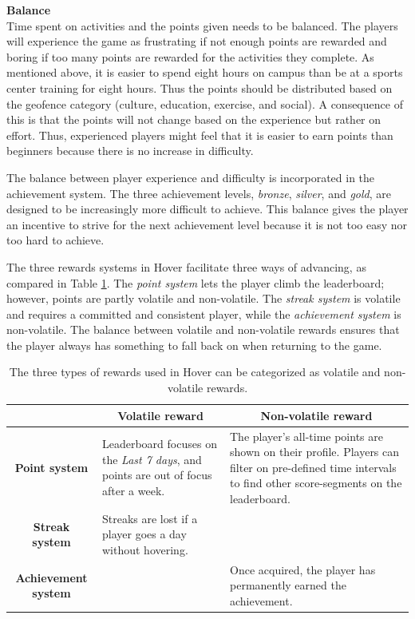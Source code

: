 \textbf{Balance} \\
Time spent on activities and the points given needs to be balanced. The players will experience the game as frustrating if not enough points are rewarded and boring if too many points are rewarded for the activities they complete. As mentioned above, it is easier to spend eight hours on campus than be at a sports center training for eight hours. Thus the points should be distributed based on the geofence category (culture, education, exercise, and social). A consequence of this is that the points will not change based on the experience but rather on effort. Thus, experienced players might feel that it is easier to earn points than beginners because there is no increase in difficulty.

The balance between player experience and difficulty is incorporated in the achievement system. The three achievement levels, \textit{bronze}, \textit{silver}, and \textit{gold}, are designed to be increasingly more difficult to achieve. This balance gives the player an incentive to strive for the next achievement level because it is not too easy nor too hard to achieve. 

The three rewards systems in Hover facilitate three ways of advancing, as compared in Table \ref{tab:rewardsystems_balance}. The \textit{point system} lets the player climb the leaderboard; however, points are partly volatile and non-volatile. The \textit{streak system} is volatile and requires a committed and consistent player, while the \textit{achievement system} is non-volatile. The balance between volatile and non-volatile rewards ensures that the player always has something to fall back on when returning to the game.

\begin{table}[H]
    \centering
    \begin{tabularx}{\textwidth}{|c|X|X|} \hline
    \cellcolor[HTML]{A4C2F4} & \multicolumn{1}{c|}{\cellcolor[HTML]{A4C2F4}\textbf{Volatile reward}} & \multicolumn{1}{c|}{\cellcolor[HTML]{A4C2F4}\textbf{Non-volatile reward}} \\ \hline
    \cellcolor[HTML]{A4C2F4}\textbf{Point system} & Leaderboard focuses on the \textit{Last 7 days}, and points are out  of focus after a week. & The player’s all-time points  are shown on their profile. Players can filter on pre-defined time intervals to find other score-segments on the leaderboard. \\ \hline
    \cellcolor[HTML]{A4C2F4}\textbf{Streak system} & Streaks are lost if a player goes a day without hovering. &  \\ \hline
    \cellcolor[HTML]{A4C2F4}\textbf{Achievement system} &  & Once acquired, the player has permanently earned the achievement. \\ \hline
    \end{tabularx}
    \caption{The three types of rewards used in Hover can be categorized as volatile and non-volatile rewards.}
    \label{tab:rewardsystems_balance}
\end{table}

